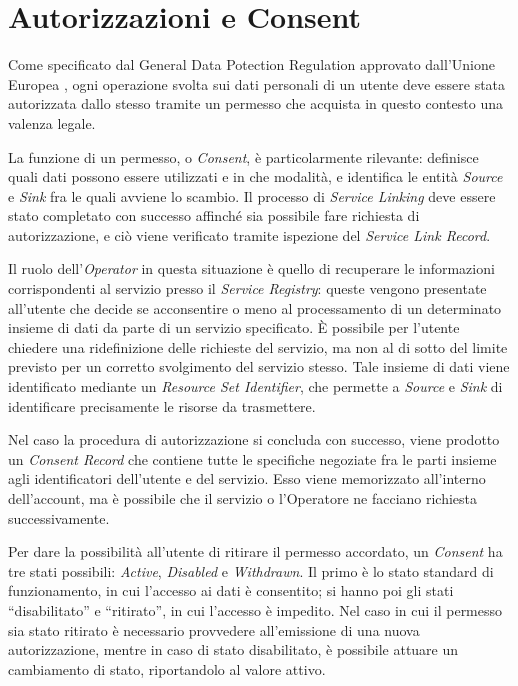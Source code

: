 \section{Autorizzazioni e Consent}
\label{sec:MD-AuthConsent}
Come specificato dal General Data Potection Regulation approvato dall'Unione Europea \cite{gdpr}, ogni operazione svolta sui dati personali di un utente deve essere stata autorizzata dallo stesso tramite un permesso che acquista in questo contesto una valenza legale.

La funzione di un permesso, o \textit{Consent}, \`e particolarmente rilevante: definisce quali dati possono essere utilizzati e in che modalit\`a, e identifica le entit\`a \textit{Source} e \textit{Sink} fra le quali avviene lo scambio. Il processo di \textit{Service Linking} deve essere stato completato con successo affinch\'e sia possibile fare richiesta di autorizzazione, e ci\`o viene verificato tramite ispezione del \textit{Service Link Record}.

Il ruolo dell’\textit{Operator} in questa situazione \`e quello di recuperare le informazioni corrispondenti al servizio presso il \textit{Service Registry}: queste vengono presentate all’utente che decide se acconsentire o meno al processamento di un determinato insieme di dati da parte di un servizio specificato. \`E possibile per l’utente chiedere una ridefinizione delle richieste del servizio, ma non al di sotto del limite previsto per un corretto svolgimento del servizio stesso. Tale insieme di dati viene identificato mediante un \textit{Resource Set Identifier}, che permette a \textit{Source} e \textit{Sink} di identificare precisamente le risorse da trasmettere.

Nel caso la procedura di autorizzazione si concluda con successo, viene prodotto un \textit{Consent Record} che contiene tutte le specifiche negoziate fra le parti insieme agli identificatori dell’utente e del servizio. Esso viene memorizzato all’interno dell’account, ma \`e possibile che il servizio o l’Operatore ne facciano richiesta successivamente. 

Per dare la possibilit\`a all’utente di ritirare il permesso accordato, un \textit{Consent} ha tre stati possibili: \textit{Active}, \textit{Disabled} e \textit{Withdrawn}. Il primo \`e lo stato standard di funzionamento, in cui l’accesso ai dati \`e consentito; si hanno poi gli stati “disabilitato” e “ritirato”, in cui l’accesso \`e impedito. Nel caso in cui il permesso sia stato ritirato \`e necessario provvedere all’emissione di una nuova autorizzazione, mentre in caso di stato disabilitato, \`e possibile attuare un cambiamento di stato, riportandolo al valore attivo.

